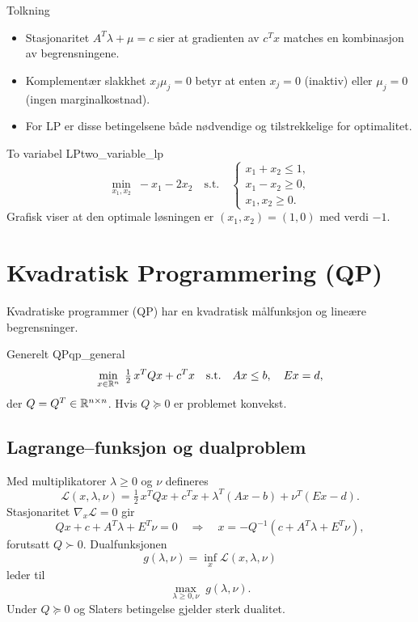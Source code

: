 \begin{remark}{Tolkning}{}
\begin{itemize}
	\item Stasjonaritet $A^T\lambda+\mu=c$ sier at gradienten av $c^T x$ matches en kombinasjon av begrensningene.
	\item Komplementær slakkhet $x_j\mu_j=0$ betyr at enten $x_j=0$ (inaktiv) eller $\mu_j=0$ (ingen marginalkostnad).
	\item For LP er disse betingelsene både nødvendige og tilstrekkelige for optimalitet.
\end{itemize}
\end{remark}

\begin{example}{To variabel LP}{two_variable_lp}
\[
	\min_{x_1,x_2}\;-x_1 - 2x_2
	\quad\text{s.t.}\quad
	\begin{cases}
		x_1 + x_2 \le 1,\\
		x_1 - x_2 \ge 0,\\
		x_1,x_2\ge0.
	\end{cases}
\]
Grafisk viser at den optimale løsningen er $(x_1,x_2)=(1,0)$ med verdi $-1$.
\end{example}
\section{Kvadratisk Programmering (QP)}
Kvadratiske programmer (QP) har en kvadratisk målfunksjon og lineære begrensninger.

\begin{definition}{Generelt QP}{qp_general}
\[
	\min_{x\in\mathbb{R}^n}\;\tfrac12\,x^T Q x + c^T x
	\quad\text{s.t.}\quad
	A x \le b,\quad
	E x = d,
\]
der $Q=Q^T\in\mathbb{R}^{n\times n}$. Hvis $Q\succeq0$ er problemet konvekst.
\end{definition}

\subsection{Lagrange--funksjon og dualproblem}
Med multiplikatorer $\lambda\ge0$ og $\nu$ defineres
\[
	\mathcal L(x,\lambda,\nu)
		= \tfrac12\,x^T Q x + c^T x + \lambda^T(Ax-b) + \nu^T(Ex-d).
\]
Stasjonaritet $\nabla_x\mathcal L=0$ gir
\[
	Qx + c + A^T\lambda + E^T\nu = 0
	\quad\Longrightarrow\quad
	x = -Q^{-1}(c + A^T\lambda + E^T\nu),
\]
forutsatt $Q\succ0$. Dualfunksjonen
\[
	g(\lambda,\nu)
	= \inf_{x}\mathcal L(x,\lambda,\nu)
\]
leder til
\[
	\max_{\lambda\ge0,\nu}\;g(\lambda,\nu).
\]
Under $Q\succeq0$ og Slaters betingelse gjelder sterk dualitet.

